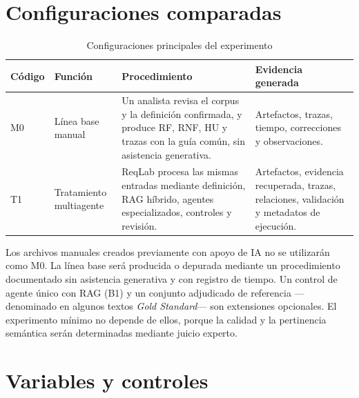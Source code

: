 \section{Configuraciones comparadas}

\begin{table}[H]
  \centering
  \caption{Configuraciones principales del experimento}
  \label{tab:configuraciones}
  \small
  \begin{tabularx}{\textwidth}{p{1.3cm}p{3.3cm}YY}
    \toprule
    Código & Función & Procedimiento & Evidencia generada \\
    \midrule
    M0 & Línea base manual & Un analista revisa el corpus y la definición confirmada, y produce RF, RNF, HU y trazas con la guía común, sin asistencia generativa. & Artefactos, trazas, tiempo, correcciones y observaciones. \\
    T1 & Tratamiento multiagente & ReqLab procesa las mismas entradas mediante definición, RAG híbrido, agentes especializados, controles y revisión. & Artefactos, evidencia recuperada, trazas, relaciones, validación y metadatos de ejecución. \\
    \bottomrule
  \end{tabularx}
\end{table}

Los archivos manuales creados previamente con apoyo de IA no se utilizarán como M0. La línea base será producida o depurada mediante un procedimiento documentado sin asistencia generativa y con registro de tiempo. Un control de agente único con RAG (B1) y un conjunto adjudicado de referencia ---denominado en algunos textos \emph{Gold Standard}--- son extensiones opcionales. El experimento mínimo no depende de ellos, porque la calidad y la pertinencia semántica serán determinadas mediante juicio experto.

\section{Variables y controles}

